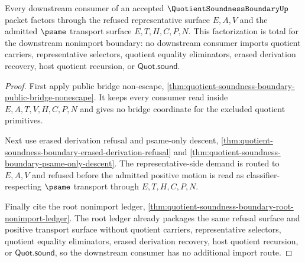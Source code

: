 \begin{theorem}
\label{thm:quotient-soundness-boundary-downstream-nonimport-totality}
Every downstream consumer of an accepted $\QuotientSoundnessBoundaryUp$ packet factors through the refused representative surface $E,A,V$ and the admitted $\psame$ transport surface $E,T,H,C,P,N$. This factorization is total for the downstream nonimport boundary: no downstream consumer imports quotient carriers, representative selectors, quotient equality eliminators, erased derivation recovery, host quotient recursion, or $\mathsf{Quot.sound}$.
\end{theorem}
\begin{proof}
First apply public bridge non-escape, \autoref{thm:quotient-soundness-boundary-public-bridge-nonescape}. It keeps every consumer read inside $E,A,T,V,H,C,P,N$ and gives no bridge coordinate for the excluded quotient primitives.

Next use erased derivation refusal and psame-only descent, \autoref{thm:quotient-soundness-boundary-erased-derivation-refusal} and \autoref{thm:quotient-soundness-boundary-psame-only-descent}. The representative-side demand is routed to $E,A,V$ and refused before the admitted positive motion is read as classifier-respecting $\psame$ transport through $E,T,H,C,P,N$.

Finally cite the root nonimport ledger, \autoref{thm:quotient-soundness-boundary-root-nonimport-ledger}. The root ledger already packages the same refusal surface and positive transport surface without quotient carriers, representative selectors, quotient equality eliminators, erased derivation recovery, host quotient recursion, or $\mathsf{Quot.sound}$, so the downstream consumer has no additional import route.
\end{proof}


